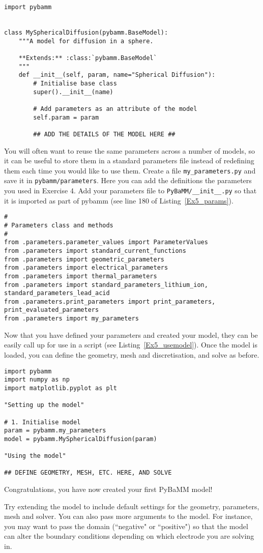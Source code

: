 \documentclass[a4paper,11pt]{article}
\begin{document}
\begin{lstlisting}[label={Ex5_model},caption=Creating you new model.]
import pybamm


class MySphericalDiffusion(pybamm.BaseModel):
    """A model for diffusion in a sphere.

    **Extends:** :class:`pybamm.BaseModel`
    """
    def __init__(self, param, name="Spherical Diffusion"):
        # Initialise base class
        super().__init__(name)

        # Add parameters as an attribute of the model
        self.param = param

        ## ADD THE DETAILS OF THE MODEL HERE ##
\end{lstlisting}

You will often want to reuse the same parameters across a number of models, so it can be useful to store them in a standard parameters file instead of redefining them each time you would like to use them. Create a file \texttt{my\_parameters.py} and save it in \texttt{pybamm/parameters}. Here you can add the definitions the parameters you used in Exercise 4. Add your parameters file to \texttt{PyBaMM/\_\_init\_\_.py} so that it is imported as part of pybamm (see line 180 of Listing~\ref{Ex5_params}).

\begin{lstlisting}[label={Ex5_params},caption=Adding your parameters to the init file., firstnumber=170]
#
# Parameters class and methods
#
from .parameters.parameter_values import ParameterValues
from .parameters import standard_current_functions
from .parameters import geometric_parameters
from .parameters import electrical_parameters
from .parameters import thermal_parameters
from .parameters import standard_parameters_lithium_ion, standard_parameters_lead_acid
from .parameters.print_parameters import print_parameters, print_evaluated_parameters
from .parameters import my_parameters
\end{lstlisting}

Now that you have defined your parameters and created your model, they can be easily call up for use in a script (see Listing~\ref{Ex5_usemodel}). Once the model is loaded, you can define the geometry, mesh and discretisation, and solve as before.

\begin{lstlisting}[label={Ex5_usemodel},caption=Using your model.]
import pybamm
import numpy as np
import matplotlib.pyplot as plt

"Setting up the model"

# 1. Initialise model
param = pybamm.my_parameters
model = pybamm.MySphericalDiffusion(param)

"Using the model"

## DEFINE GEOMETRY, MESH, ETC. HERE, AND SOLVE
\end{lstlisting}

Congratulations, you have now created your first PyBaMM model!

Try extending the model to include default settings for the geometry, parameters, mesh and solver. You can also pass more arguments to the model. For instance, you may want to pass the domain (``negative" or ``positive") so that the model can alter the boundary conditions depending on which electrode you are solving in.
\end{document}
